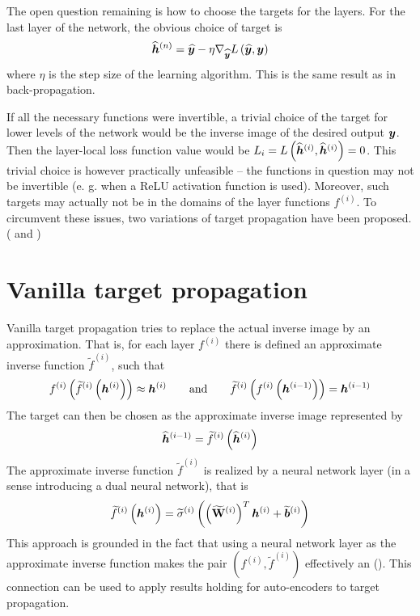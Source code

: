 The open question remaining is how to choose the targets for the layers. For the last layer of the network, the obvious choice of target is
\begin{equation}\label{targetprop_last_layer_target}
	\widehat{\bm{h}}^{(n)} = \widehat{\bm{y}} - \eta \nabla_{\widehat{\bm{y}}} L \left( \widehat{\bm{y}}, \bm{y} \right)
\end{equation}
where \( \eta \) is the step size of the learning algorithm. This is the same result as in back-propagation.

If all the necessary functions were invertible, a trivial choice of the target for lower levels of the network would be the inverse image of the desired output \( \bm{y} \). Then the layer-local loss function value would be \( L_i = L \left( \widehat{\bm{h}}^{(i)}, \widehat{\bm{h}}^{(i)} \right) = 0 \). This trivial choice is however practically unfeasible -- the functions in question may not be invertible (e. g. when a ReLU activation function is used). Moreover, such targets may actually not be in the domains of the layer functions \( f^{(i)} \). To circumvent these issues, two variations of target propagation have been proposed. (\cite{bengio_how_2014} and \cite{lee_difference_2015})

\section{Vanilla target propagation}

Vanilla target propagation tries to replace the actual inverse image by an approximation. That is, for each layer \( f^{(i)} \) there is defined an approximate inverse function \( \widetilde{f}^{(i)} \), such that
\[ f^{(i)} \left( \widetilde{f}^{(i)} \left( \bm{h}^{(i)} \right) \right) \approx \bm{h}^{(i)} \qquad \text{and} \qquad \widetilde{f}^{(i)} \left( f^{(i)} \left( \bm{h}^{(i - 1)} \right) \right) = \bm{h}^{(i - 1)} \]
The target can then be chosen as the approximate inverse image represented by
\[ \widehat{\bm{h}}^{(i - 1)} = \widetilde{f}^{(i)} \left( \widehat{\bm{h}}^{(i)} \right) \]
The approximate inverse function \( \widetilde{f}^{(i)} \) is realized by a neural network layer (in a sense introducing a dual neural network), that is
\[ \widetilde{f}^{(i)} \left( \bm{h}^{(i)} \right) = \widetilde{\sigma}^{(i)} \left( \left( {\widetilde{\mathbf{W}}}^{(i)} \right)^T \bm{h}^{(i)} + \widetilde{\bm{b}}^{(i)} \right) \]
This approach is grounded in the fact that using a neural network layer as the approximate inverse function makes the pair \( \left( f^{(i)}, \widetilde{f}^{(i)} \right) \) effectively an  (\cite{bourlard_auto-association_1988}). This connection can be used to apply results holding for auto-encoders to target propagation.

